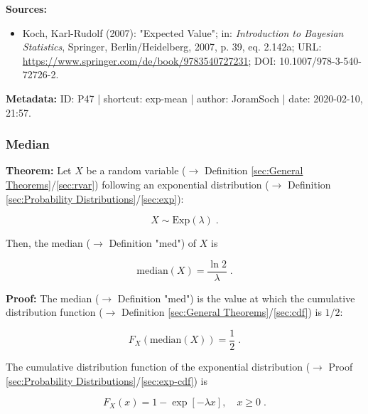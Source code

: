 \documentclass[a4paper,12pt,twoside]{book}
\begin{document}
\vspace{1em}
\textbf{Sources:}
\begin{itemize}
\item Koch, Karl-Rudolf (2007): "Expected Value"; in: \textit{Introduction to Bayesian Statistics}, Springer, Berlin/Heidelberg, 2007, p. 39, eq. 2.142a; URL: \url{https://www.springer.com/de/book/9783540727231}; DOI: 10.1007/978-3-540-72726-2.
\end{itemize}


\vspace{1em}
\textbf{Metadata:} ID: P47 | shortcut: exp-mean | author: JoramSoch | date: 2020-02-10, 21:57.
\vspace{1em}



\subsubsection[\textbf{Median}]{Median} \label{sec:exp-med}
\setcounter{equation}{0}

\textbf{Theorem:} Let $X$ be a random variable ($\rightarrow$ Definition \ref{sec:General Theorems}/\ref{sec:rvar}) following an exponential distribution ($\rightarrow$ Definition \ref{sec:Probability Distributions}/\ref{sec:exp}):

\begin{equation} \label{eq:exp-med-exp}
X \sim \mathrm{Exp}(\lambda) \; .
\end{equation}

Then, the median ($\rightarrow$ Definition "med") of $X$ is

\begin{equation} \label{eq:exp-med-exp-med}
\mathrm{median}(X) = \frac{\ln 2}{\lambda} \; .
\end{equation}


\vspace{1em}
\textbf{Proof:} The median ($\rightarrow$ Definition "med") is the value at which the cumulative distribution function ($\rightarrow$ Definition \ref{sec:General Theorems}/\ref{sec:cdf}) is $1/2$:

\begin{equation} \label{eq:exp-med-median}
F_X(\mathrm{median}(X)) = \frac{1}{2} \; .
\end{equation}

The cumulative distribution function of the exponential distribution ($\rightarrow$ Proof \ref{sec:Probability Distributions}/\ref{sec:exp-cdf}) is

\begin{equation} \label{eq:exp-med-exp-cdf}
F_X(x) = 1 - \exp[-\lambda x], \quad x \geq 0 \; .
\end{equation}
\end{document}
